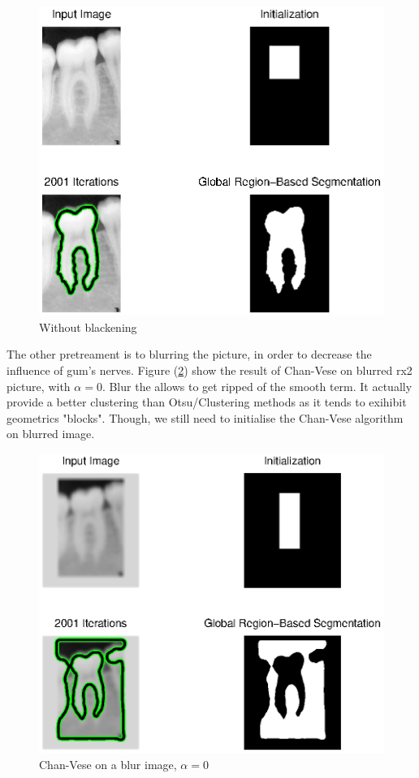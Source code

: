 \begin{figure}[H]
\centering
\includegraphics[scale=0.7]{images/cvonnonblackrx2.eps}
\caption{Without blackening}
\label{withoutblack}
\end{figure}

The other pretreament is to blurring the picture, in order to decrease the influence of gum's nerves. Figure (\ref{frx2}) show the result of Chan-Vese on blurred rx2 picture, with $\alpha = 0$. Blur the allows to get ripped of the smooth term. It actually provide a better clustering than Otsu/Clustering methods as it tends to exihibit geometrics "blocks". Though, we still need to initialise the Chan-Vese algorithm on blurred image.

\begin{figure}[H]
\centering
\includegraphics[scale=0.7]{images/flourx2.eps}
\caption{Chan-Vese on a blur image, $\alpha = 0$}
\label{frx2}
\end{figure}




